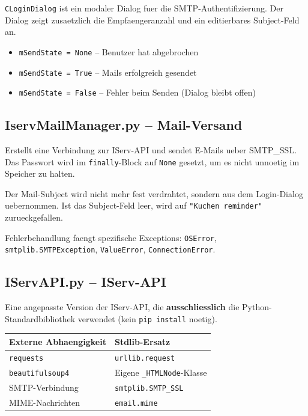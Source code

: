 \documentclass[12pt, a4paper]{article}
\begin{document}
\texttt{CLoginDialog} ist ein modaler Dialog fuer die SMTP-Authentifizierung.
Der Dialog zeigt zusaetzlich die Empfaengeranzahl und ein editierbares
Subject-Feld an.

\begin{successbox}
\begin{itemize}[leftmargin=1.5em, nosep]
    \item \texttt{mSendState = None} -- Benutzer hat abgebrochen
    \item \texttt{mSendState = True} -- Mails erfolgreich gesendet
    \item \texttt{mSendState = False} -- Fehler beim Senden (Dialog bleibt offen)
\end{itemize}
\end{successbox}


\subsection{IservMailManager.py -- Mail-Versand}

Erstellt eine Verbindung zur IServ-API und sendet E-Mails ueber SMTP\_SSL.
Das Passwort wird im \texttt{finally}-Block auf \texttt{None} gesetzt,
um es nicht unnoetig im Speicher zu halten.

Der Mail-Subject wird nicht mehr fest verdrahtet, sondern aus dem Login-Dialog
uebernommen. Ist das Subject-Feld leer, wird auf \texttt{"Kuchen reminder"}
zurueckgefallen.

Fehlerbehandlung faengt spezifische Exceptions:
\texttt{OSError}, \texttt{smtplib.SMTPException}, \texttt{ValueError},
\texttt{ConnectionError}.


\subsection{IServAPI.py -- IServ-API}

Eine angepasste Version der IServ-API, die \textbf{ausschliesslich} die
Python-Standardbibliothek verwendet (kein \texttt{pip install} noetig).

\begin{table}[ht!]
\centering
{}
\begin{tabularx}{0.85\textwidth}{lX}
\toprule
\textbf{Externe Abhaengigkeit} & \textbf{Stdlib-Ersatz} \\
\midrule
\texttt{requests} & \texttt{urllib.request} \\
\texttt{beautifulsoup4} & Eigene \texttt{\_HTMLNode}-Klasse \\
SMTP-Verbindung & \texttt{smtplib.SMTP\_SSL} \\
MIME-Nachrichten & \texttt{email.mime} \\
\bottomrule
\end{tabularx}
\end{table}
\end{document}
